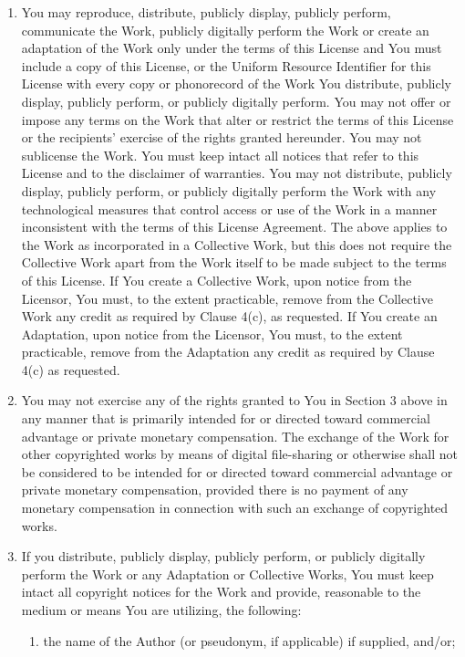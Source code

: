 \begin{enumerate}
      \begin{enumerate}
       \item {You may reproduce, distribute, publicly display, publicly perform, communicate the Work, publicly digitally perform the Work or create an adaptation of the Work only under the terms of this License and You must include a copy of this License, or the Uniform Resource Identifier for this License with every copy or phonorecord of the Work You distribute, publicly display, publicly perform, or publicly digitally perform. You may not offer or impose any terms on the Work that alter or restrict the terms of this License or the recipients' exercise of the rights granted hereunder. You may not sublicense the Work. You must keep intact all notices that refer to this License and to the disclaimer of warranties. You may not distribute, publicly display, publicly perform, or publicly digitally perform the Work with any technological measures that control access or use of the Work in a manner inconsistent with the terms of this License Agreement. The above applies to the Work as incorporated in a Collective Work, but this does not require the Collective Work apart from the Work itself to be made subject to the terms of this License. If You create a Collective Work, upon notice from the Licensor, You must, to the extent practicable, remove from the Collective Work any credit as required by Clause 4(c), as requested. If You create an Adaptation, upon notice from the Licensor, You must, to the extent practicable, remove from the Adaptation any credit as required by Clause 4(c) as requested.}
	\item {You may not exercise any of the rights granted to You in Section 3 above in any manner that is primarily intended for or directed toward commercial advantage or private monetary compensation. The exchange of the Work for other copyrighted works by means of digital file-sharing or otherwise shall not be considered to be intended for or directed toward commercial advantage or private monetary compensation, provided there is no payment of any monetary compensation in connection with such an exchange of copyrighted works.}
	\item {If you distribute, publicly display, publicly perform, or publicly digitally perform the Work or any Adaptation or Collective Works, You must keep intact all copyright notices for the Work and provide, reasonable to the medium or means You are utilizing, the following:}
	    \begin{enumerate}
	     \item{the name of the Author (or pseudonym, if applicable) if supplied, and/or;}

\end{enumerate}
\end{enumerate}
\end{enumerate}
